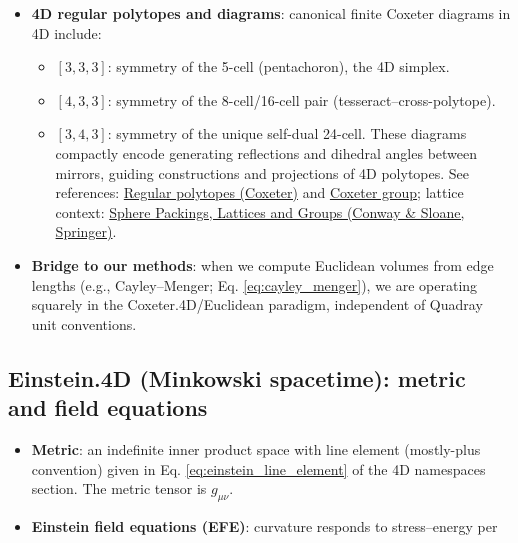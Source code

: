 \documentclass[
  10pt,
]{article}
\providecommand{\tightlist}{%
  \setlength{\itemsep}{0pt}\setlength{\parskip}{0pt}}
\begin{document}
\begin{itemize}
\tightlist
\item
  \textbf{4D regular polytopes and diagrams}: canonical finite Coxeter
  diagrams in 4D include:

  \begin{itemize}
  \tightlist
  \item
    \([3,3,3]\): symmetry of the 5-cell (pentachoron), the 4D simplex.
  \item
    \([4,3,3]\): symmetry of the 8-cell/16-cell pair
    (tesseract--cross-polytope).
  \item
    \([3,4,3]\): symmetry of the unique self-dual 24-cell. These
    diagrams compactly encode generating reflections and dihedral angles
    between mirrors, guiding constructions and projections of 4D
    polytopes. See references:
    \href{https://en.wikipedia.org/wiki/Regular_polytope}{Regular
    polytopes (Coxeter)} and
    \href{https://en.wikipedia.org/wiki/Coxeter_group}{Coxeter group};
    lattice context:
    \href{https://link.springer.com/book/10.1007/978-1-4757-6568-7}{Sphere
    Packings, Lattices and Groups (Conway \& Sloane, Springer)}.
  \end{itemize}
\item
  \textbf{Bridge to our methods}: when we compute Euclidean volumes from
  edge lengths (e.g., Cayley--Menger; Eq. \eqref{eq:cayley_menger}), we
  are operating squarely in the Coxeter.4D/Euclidean paradigm,
  independent of Quadray unit conventions.
\end{itemize}

\hypertarget{einstein.4d-minkowski-spacetime-metric-and-field-equations}{%
\subsection{Einstein.4D (Minkowski spacetime): metric and field
equations}\label{einstein.4d-minkowski-spacetime-metric-and-field-equations}}

\begin{itemize}
\tightlist
\item
  \textbf{Metric}: an indefinite inner product space with line element
  (mostly-plus convention) given in Eq. \eqref{eq:einstein_line_element}
  of the 4D namespaces section. The metric tensor is \(g_{\mu\nu}\).
\item
  \textbf{Einstein field equations (EFE)}: curvature responds to
  stress--energy per
\end{itemize}
\end{document}
